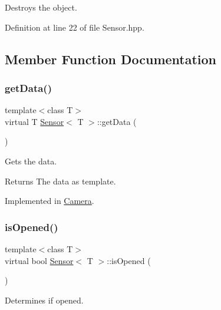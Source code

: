 Destroys the object. 



Definition at line 22 of file Sensor.\+hpp.



\subsection{Member Function Documentation}
\mbox{\label{class_sensor_ae9ab3f3715367df03900706eb9806afd}} 
\subsubsection{\texorpdfstring{get\+Data()}{getData()}}
{\footnotesize\ttfamily template$<$class T$>$ \\
virtual T \hyperlink{class_sensor}{Sensor}$<$ T $>$\+::get\+Data (\begin{DoxyParamCaption}{ }\end{DoxyParamCaption})\hspace{0.3cm}{\ttfamily [pure virtual]}}



Gets the data. 

\begin{DoxyReturn}{Returns}
The data as template. 
\end{DoxyReturn}


Implemented in \hyperlink{class_camera_acd484ba9de5bb9f6a86bf40396dc4e69}{Camera}.

\mbox{\label{class_sensor_a78f10e5c1fd3c7e5fcbbf4ca735ac1e7}} 
\subsubsection{\texorpdfstring{is\+Opened()}{isOpened()}}
{\footnotesize\ttfamily template$<$class T$>$ \\
virtual bool \hyperlink{class_sensor}{Sensor}$<$ T $>$\+::is\+Opened (\begin{DoxyParamCaption}{ }\end{DoxyParamCaption})\hspace{0.3cm}{\ttfamily [pure virtual]}}



Determines if opened. 

